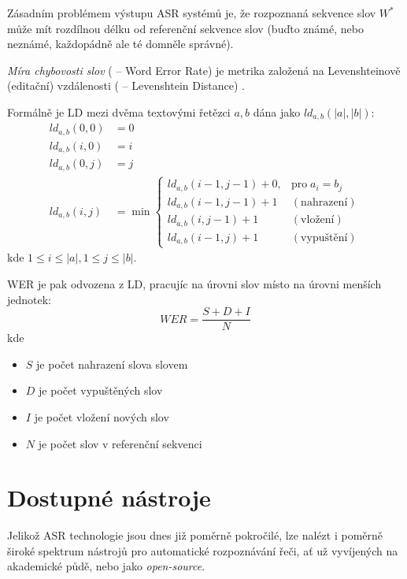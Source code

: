 Zásadním problémem výstupu ASR systémů je, že rozpoznaná sekvence slov $W^*$ může mít rozdílnou délku od referenční sekvence slov (buďto známé, nebo neznámé, každopádně ale té domněle správné). 

{\sl Míra chybovosti slov} ( -- Word Error Rate) je metrika založená na Levenshteinově (editační) vzdálenosti ( -- Levenshtein Distance) \cite{schluter_2010}.

Formálně je LD mezi dvěma textovými řetězci $a, b$ dána jako $ld_{a,b}(|a|,|b|)$:
%
\begin{align}
	\label{eq:ld}
	ld_{a,b}(0,0) &= 0\\
	ld_{a,b}(i,0) &= i\\
	ld_{a,b}(0,j) &= j\\
	ld_{a,b}(i,j) &= 
	\min
	\begin{cases}
		ld_{a,b}(i-1,j-1)+0, & \text{pro}\;a_i = b_j \\
		ld_{a,b}(i-1,j-1)+1  & (\text{nahrazení}) \\
		ld_{a,b}(i,j-1)+1    & (\text{vložení}) \\
		ld_{a,b}(i-1,j)+1    & (\text{vypuštění})
	\end{cases}
\end{align}
%
kde $1 \le i \le |a|, 1 \le j \le |b|$.

WER je pak odvozena z LD, pracujíc na úrovni slov místo na úrovni menších jednotek:
%
\begin{equation}
	\label{eq:wer}
	WER = \frac{S+D+I}{N}
\end{equation}
%
kde
%
\begin{itemize}
\item $S$ je počet nahrazení slova slovem
\item $D$ je počet vypuštěných slov
\item $I$ je počet vložení nových slov
\item $N$ je počet slov v referenční sekvenci
\end{itemize}

\section{Dostupné nástroje}

Jelikož ASR technologie jsou dnes již poměrně pokročilé, lze nalézt i poměrně široké spektrum nástrojů pro automatické rozpoznávání řeči, ať už vyvíjených na akademické půdě, nebo jako {\sl open-source}.

